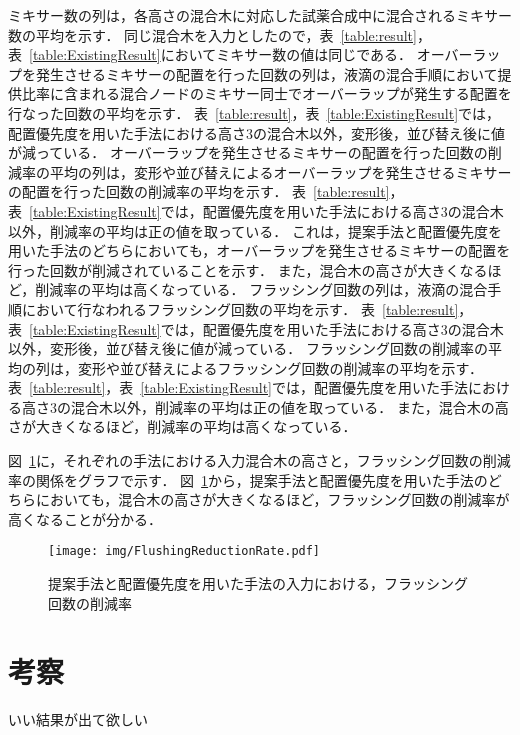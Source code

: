 ミキサー数の列は，各高さの混合木に対応した試薬合成中に混合されるミキサー数の平均を示す．
同じ混合木を入力としたので，表~\ref{table:result}，表~\ref{table:ExistingResult}においてミキサー数の値は同じである．
オーバーラップを発生させるミキサーの配置を行った回数の列は，液滴の混合手順において提供比率に含まれる混合ノードのミキサー同士でオーバーラップが発生する配置を行なった回数の平均を示す．
表~\ref{table:result}，表~\ref{table:ExistingResult}では，配置優先度を用いた手法における高さ3の混合木以外，変形後，並び替え後に値が減っている．
オーバーラップを発生させるミキサーの配置を行った回数の削減率の平均の列は，変形や並び替えによるオーバーラップを発生させるミキサーの配置を行った回数の削減率の平均を示す．
表~\ref{table:result}，表~\ref{table:ExistingResult}では，配置優先度を用いた手法における高さ3の混合木以外，削減率の平均は正の値を取っている．
これは，提案手法と配置優先度を用いた手法のどちらにおいても，オーバーラップを発生させるミキサーの配置を行った回数が削減されていることを示す．
また，混合木の高さが大きくなるほど，削減率の平均は高くなっている．
フラッシング回数の列は，液滴の混合手順において行なわれるフラッシング回数の平均を示す．
表~\ref{table:result}，表~\ref{table:ExistingResult}では，配置優先度を用いた手法における高さ3の混合木以外，変形後，並び替え後に値が減っている．
フラッシング回数の削減率の平均の列は，変形や並び替えによるフラッシング回数の削減率の平均を示す．
表~\ref{table:result}，表~\ref{table:ExistingResult}では，配置優先度を用いた手法における高さ3の混合木以外，削減率の平均は正の値を取っている．
また，混合木の高さが大きくなるほど，削減率の平均は高くなっている．

図~\ref{fig:FlushingReductionRate}に，それぞれの手法における入力混合木の高さと，フラッシング回数の削減率の関係をグラフで示す．
図~\ref{fig:FlushingReductionRate}から，提案手法と配置優先度を用いた手法のどちらにおいても，混合木の高さが大きくなるほど，フラッシング回数の削減率が高くなることが分かる．

\begin{figure}[tbp]
 \centering\texttt{[image: img/FlushingReductionRate.pdf]}

 \caption{提案手法と配置優先度を用いた手法の入力における，フラッシング回数の削減率}\label{fig:FlushingReductionRate}
\end{figure}

\section{考察}
いい結果が出て欲しい
